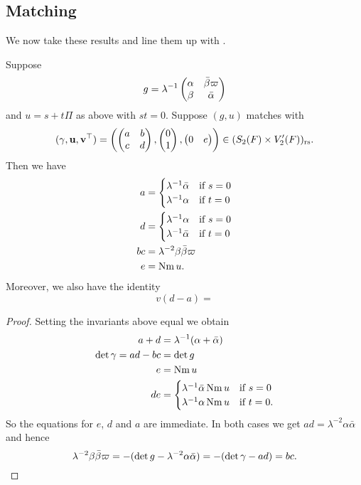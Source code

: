 \subsection{Matching}
We now take these results and line them up with .

\begin{lemma}
  \label{lem:finale_match}
  Suppose
  \[ g = \lambda^{-1} \begin{pmatrix}
    \alpha & \bar\beta \varpi \\
    \beta &  \bar\alpha
    \end{pmatrix} \]
  and $u = s + t \Pi$ as above with $s t = 0$.
  Suppose $(g,u)$ matches with
  \[ (\gamma, \mathbf u, \mathbf v^\top) = \left( \begin{pmatrix} a & b \\ c & d \end{pmatrix},
    \begin{pmatrix} 0 \\ 1 \end{pmatrix}, \begin{pmatrix} 0 & e \end{pmatrix} \right)
    \in (S_2(F) \times V'_2(F))_{\mathrm{rs}}. \]
  Then we have
  \begin{align*}
    a &= \begin{cases}
      \lambda^{-1} \bar\alpha & \text{if } s = 0 \\
      \lambda^{-1} \alpha & \text{if } t = 0 \\
    \end{cases} \\
    d &= \begin{cases}
      \lambda^{-1} \alpha & \text{if } s = 0 \\
      \lambda^{-1} \bar\alpha & \text{if } t = 0 \\
    \end{cases} \\
    bc &= \lambda^{-2} \beta \bar\beta \varpi \\
    e &= \operatorname{Nm} u.
  \end{align*}
  Moreover, we also have the identity
  \[
    v(d - a)
    =
  \]
\end{lemma}
\begin{proof}
  Setting the invariants above equal we obtain
  \begin{align*}
    a + d &= \lambda^{-1} (\alpha + \bar\alpha) \\
    \det \gamma = ad - bc &= \det g \\
    e &= \operatorname{Nm} u \\
    de &= \begin{cases}
      \lambda^{-1} \bar\alpha \operatorname{Nm} u & \text{if } s = 0 \\
      \lambda^{-1} \alpha \operatorname{Nm} u & \text{if } t = 0.
    \end{cases}
  \end{align*}
  So the equations for $e$, $d$ and $a$ are immediate.
  In both cases we get $ad = \lambda^{-2} \alpha \bar \alpha$
  and hence
  \[ \lambda^{-2} \beta \bar \beta \varpi
    = -(\det g -  \lambda^{-2} \alpha \bar \alpha)
    = -(\det \gamma - ad) = bc. \qedhere \]
\end{proof}

